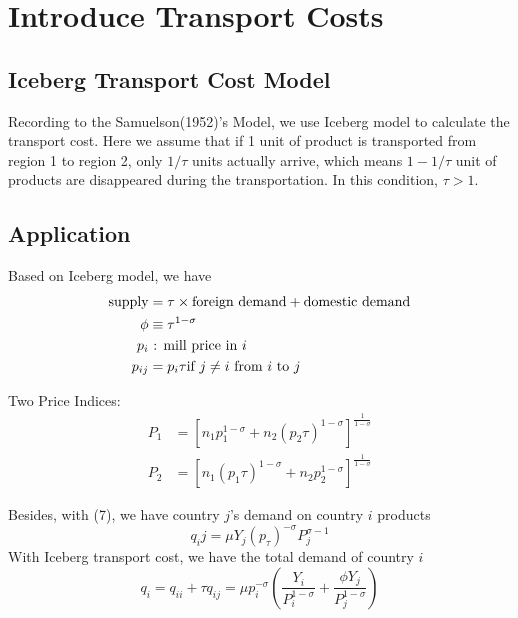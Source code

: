 \documentclass{article}
\begin{document}
\section{Introduce Transport Costs}

\subsection{Iceberg Transport Cost Model}

Recording to the Samuelson(1952)'s Model, we use Iceberg model to calculate the transport cost. Here we assume that if 1 unit of product is transported from region 1 to region 2, only $1/\tau$ units actually arrive, which means $1- 1/\tau$ unit of products are disappeared during the transportation. In this condition, $\tau > 1$. 

\subsection{Application}

Based on Iceberg model, we have 
\begin{equation}
    \notag
    \begin{aligned} 
    \text{supply} &= \tau \times \text{foreign demand}+ \text{domestic demand} \\
    \phi &\equiv \tau^{1-\sigma}\\
    p_i &\text{ : mill price in }i\\
    p_{ij} &= p_i \tau \text{if  } j \neq i \text{  from  } i \text{  to  } j \\
    \end{aligned}
\end{equation}

Two Price Indices:
\begin{equation}
    \begin{aligned}
    P_1 &= [n_1 p_1^{1-\sigma}+ n_2(p_2\tau)^{1-\sigma}]^{\frac{1}{1-\sigma}}\\
    P_2 &= [n_1 (p_1\tau)^{1-\sigma}+ n_2p_2^{1-\sigma}]^{\frac{1}{1-\sigma}} 
    \end{aligned}
\end{equation}

Besides, with (7), we have country $j$'s demand on country $i$ products
$$q_ij = \mu Y_j(p_\tau)^{- \sigma} P_j^{\sigma -1}$$
With Iceberg transport cost, we have the total demand of country $i$ 
\begin{equation}
    q_i = q_{ii} + \tau q_{ij} = \mu p_i^ {-\sigma}(\frac{Y_i}{P_i^{1-\sigma}}+ \frac{\phi Y_j}{P_j^{1-\sigma}})
\end{equation}
\end{document}
